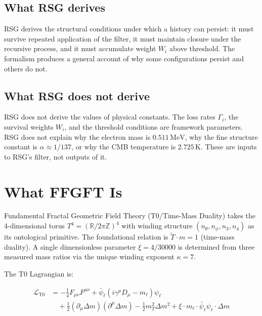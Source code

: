 \subsection{What RSG derives}

RSG derives the structural conditions under which a history can persist: it
must survive repeated application of the filter, it must maintain closure
under the recursive process, and it must accumulate weight $W_i$ above
threshold. The formalism produces a general account of why some configurations
persist and others do not.

\subsection{What RSG does not derive}

RSG does not derive the values of physical constants. The loss rates $\Gamma_i$,
the survival weights $W_i$, and the threshold conditions are framework
parameters. RSG does not explain why the electron mass is $0.511\,\text{MeV}$,
why the fine structure constant is $\alpha \approx 1/137$, or why the CMB
temperature is $2.725\,\text{K}$. These are inputs to RSG's filter, not
outputs of it.

\section{What FFGFT Is}

Fundamental Fractal Geometric Field Theory (T0/Time-Mass Duality) takes the
4-dimensional torus $T^4 = (\mathbb{R}/2\pi\mathbb{Z})^4$ with winding
structure $(n_\theta, n_\phi, n_3, n_4)$ as its ontological primitive. The
foundational relation is $\tilde{T} \cdot m = 1$ (time-mass duality). A
single dimensionless parameter $\xi = 4/30000$ is determined from three
measured mass ratios via the unique winding exponent $\kappa = 7$.

The T0 Lagrangian is:

\begin{align}
  \mathcal{L}_{\text{T0}} &= -\tfrac{1}{4}F_{\mu\nu}F^{\mu\nu}
    + \bar{\psi}_\ell(i\gamma^\mu D_\mu - m_\ell)\psi_\ell \nonumber\\
    &\quad + \tfrac{1}{2}(\partial_\mu \Delta m)(\partial^\mu \Delta m)
    - \tfrac{1}{2}m_T^2 \Delta m^2
    + \xi \cdot m_\ell \cdot \bar{\psi}_\ell \psi_\ell \cdot \Delta m
\end{align}

